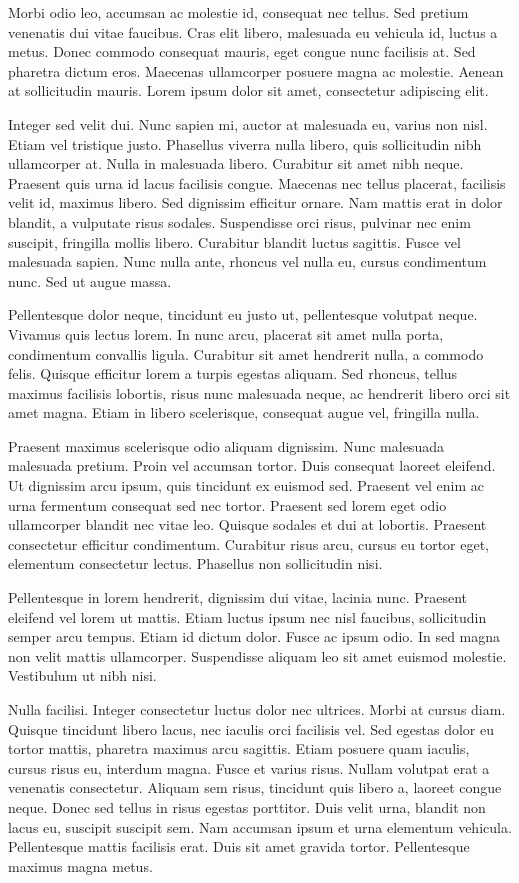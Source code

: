 \documentclass[12pt]{article}
\begin{document}
Morbi odio leo, accumsan ac molestie id, consequat nec tellus. Sed pretium venenatis dui vitae faucibus. Cras elit libero, malesuada eu vehicula id, luctus a metus. Donec commodo consequat mauris, eget congue nunc facilisis at. Sed pharetra dictum eros. Maecenas ullamcorper posuere magna ac molestie. Aenean at sollicitudin mauris. Lorem ipsum dolor sit amet, consectetur adipiscing elit.

Integer sed velit dui. Nunc sapien mi, auctor at malesuada eu, varius non nisl. Etiam vel tristique justo. Phasellus viverra nulla libero, quis sollicitudin nibh ullamcorper at. Nulla in malesuada libero. Curabitur sit amet nibh neque. Praesent quis urna id lacus facilisis congue. Maecenas nec tellus placerat, facilisis velit id, maximus libero. Sed dignissim efficitur ornare. Nam mattis erat in dolor blandit, a vulputate risus sodales. Suspendisse orci risus, pulvinar nec enim suscipit, fringilla mollis libero. Curabitur blandit luctus sagittis. Fusce vel malesuada sapien. Nunc nulla ante, rhoncus vel nulla eu, cursus condimentum nunc. Sed ut augue massa.

Pellentesque dolor neque, tincidunt eu justo ut, pellentesque volutpat neque. Vivamus quis lectus lorem. In nunc arcu, placerat sit amet nulla porta, condimentum convallis ligula. Curabitur sit amet hendrerit nulla, a commodo felis. Quisque efficitur lorem a turpis egestas aliquam. Sed rhoncus, tellus maximus facilisis lobortis, risus nunc malesuada neque, ac hendrerit libero orci sit amet magna. Etiam in libero scelerisque, consequat augue vel, fringilla nulla.

Praesent maximus scelerisque odio aliquam dignissim. Nunc malesuada malesuada pretium. Proin vel accumsan tortor. Duis consequat laoreet eleifend. Ut dignissim arcu ipsum, quis tincidunt ex euismod sed. Praesent vel enim ac urna fermentum consequat sed nec tortor. Praesent sed lorem eget odio ullamcorper blandit nec vitae leo. Quisque sodales et dui at lobortis. Praesent consectetur efficitur condimentum. Curabitur risus arcu, cursus eu tortor eget, elementum consectetur lectus. Phasellus non sollicitudin nisi.

Pellentesque in lorem hendrerit, dignissim dui vitae, lacinia nunc. Praesent eleifend vel lorem ut mattis. Etiam luctus ipsum nec nisl faucibus, sollicitudin semper arcu tempus. Etiam id dictum dolor. Fusce ac ipsum odio. In sed magna non velit mattis ullamcorper. Suspendisse aliquam leo sit amet euismod molestie. Vestibulum ut nibh nisi.

Nulla facilisi. Integer consectetur luctus dolor nec ultrices. Morbi at cursus diam. Quisque tincidunt libero lacus, nec iaculis orci facilisis vel. Sed egestas dolor eu tortor mattis, pharetra maximus arcu sagittis. Etiam posuere quam iaculis, cursus risus eu, interdum magna. Fusce et varius risus. Nullam volutpat erat a venenatis consectetur. Aliquam sem risus, tincidunt quis libero a, laoreet congue neque. Donec sed tellus in risus egestas porttitor. Duis velit urna, blandit non lacus eu, suscipit suscipit sem. Nam accumsan ipsum et urna elementum vehicula. Pellentesque mattis facilisis erat. Duis sit amet gravida tortor. Pellentesque maximus magna metus.
\end{document}
